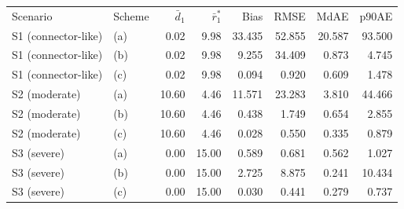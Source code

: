 \begin{tabular}{llrrrrrr}
\toprule
Scenario & Scheme & $\bar d_1$ & $\bar r_1^*$ & Bias & RMSE & MdAE & p90AE \\
S1 (connector-like) & (a) & 0.02 & 9.98 & 33.435 & 52.855 & 20.587 & 93.500 \\
S1 (connector-like) & (b) & 0.02 & 9.98 & 9.255 & 34.409 & 0.873 & 4.745 \\
S1 (connector-like) & (c) & 0.02 & 9.98 & 0.094 & 0.920 & 0.609 & 1.478 \\
\addlinespace
S2 (moderate) & (a) & 10.60 & 4.46 & 11.571 & 23.283 & 3.810 & 44.466 \\
S2 (moderate) & (b) & 10.60 & 4.46 & 0.438 & 1.749 & 0.654 & 2.855 \\
S2 (moderate) & (c) & 10.60 & 4.46 & 0.028 & 0.550 & 0.335 & 0.879 \\
\addlinespace
S3 (severe) & (a) & 0.00 & 15.00 & 0.589 & 0.681 & 0.562 & 1.027 \\
S3 (severe) & (b) & 0.00 & 15.00 & 2.725 & 8.875 & 0.241 & 10.434 \\
S3 (severe) & (c) & 0.00 & 15.00 & 0.030 & 0.441 & 0.279 & 0.737 \\
\bottomrule
\end{tabular}
